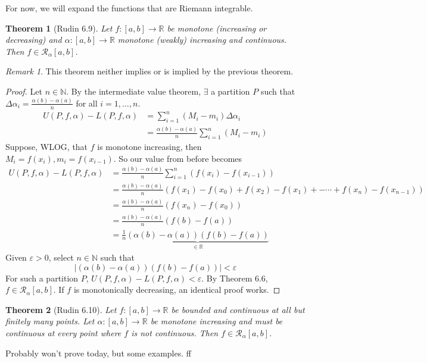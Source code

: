 \documentclass{article}
\theoremstyle{plain}
\newtheorem{theorem}{Theorem}
\theoremstyle{remark}
\newtheorem{remark}{Remark}
\newcommand{\N}{{\mathbb N}}
\newcommand{\R}{{\mathbb R}}
\newcommand{\ep}{{\varepsilon}}
\begin{document}
For now, we will expand the functions that are Riemann integrable.
\begin{theorem}[Rudin 6.9]
	Let $f \colon [a,b] \to \R$ be monotone (increasing or decreasing)
	and $\alpha \colon [a,b] \to \R$ monotone (weakly) increasing and continuous.
	Then $f \in \mathcal{R}_\alpha[a,b]$.
\end{theorem}
\begin{remark}
	This theorem neither implies or is implied by the previous theorem.
\end{remark}
\begin{proof}
	Let $n \in \N$. By the intermediate value theorem,
	$\exists$ a partition $P$ such that
	$\Delta \alpha_i = \frac{\alpha(b) - \alpha(a)}{n}$ for all $i=1,\dots,n$.
	\begin{align*}
		U(P,f,\alpha) - L(P,f,\alpha)
		&= \sum_{i=1}^n (M_i - m_i)\Delta \alpha_i\\
		&= \frac{\alpha(b) - \alpha(a)}{n}\sum_{i=1}^n (M_i - m_i)
	\end{align*}
	Suppose, WLOG, that $f$ is monotone increasing,
	then $M_i = f(x_i), m_i = f(x_{i-1})$.
	So our value from before becomes
	\begin{align*}
		U(P,f,\alpha) - L(P,f,\alpha)
		&= \frac{\alpha(b) - \alpha(a)}{n} \sum_{i=1}^n\left(f(x_i) - f(x_{i-1})\right)\\
		&= \frac{\alpha(b) - \alpha(a)}{n}
		\left(f(x_1) - f(x_0) +f(x_2) - f(x_1) +- \cdots +f(x_n) - f(x_{n-1})\right)\\
		&= \frac{\alpha(b) - \alpha(a)}{n}\left(f(x_n) - f(x_0)\right)\\
		&= \frac{\alpha(b) - \alpha(a)}{n}\left(f(b) - f(a)\right)\\
		&= \frac{1}{n}\underbrace{\left(\alpha(b) - \alpha(a)\right)
	\left(f(b) - f(a)\right)}_{\in\R}
	\end{align*}
	Given $\ep > 0$, select $n \in \N$ such that
	\[
		\left\lvert \left(\alpha(b) - \alpha(a)\right)\left(f(b) - f(a)\right)\right\rvert < \ep
	\]
	For such a partition $P$, $U(P,f,\alpha) - L(P,f,\alpha) < \ep$.
	By Theorem 6.6, $f \in \mathcal{R}_\alpha[a,b]$.
	If $f$ is monotonically decreasing, an identical proof works.
\end{proof}

\begin{theorem}[Rudin 6.10]
	Let $f \colon [a,b] \to \R$ be bounded and continuous at all
	but finitely many points.
	Let $\alpha \colon [a,b] \to \R$ be monotone increasing
	and must be continuous at every point where $f$ is not continuous.
	Then $f \in \mathcal{R}_\alpha[a,b]$.
\end{theorem}
Probably won't prove today, but some examples.
ff
\end{document}

